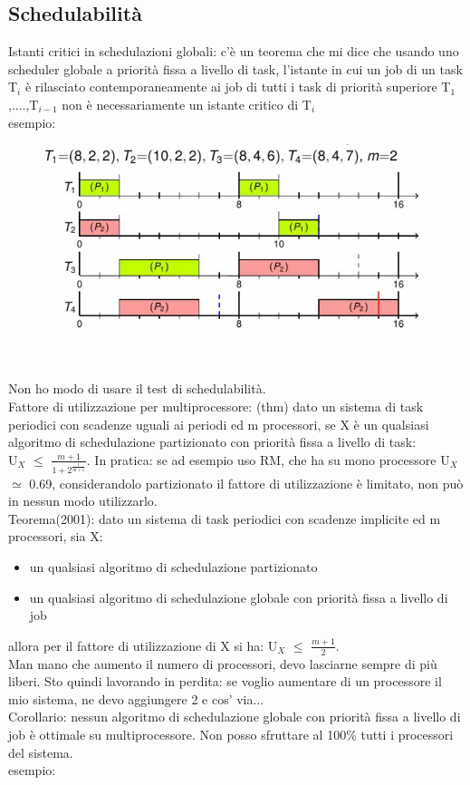 \documentclass[12pt, oneside]{extbook}
\begin{document}
\subsection{Schedulabilità}
Istanti critici in schedulazioni globali: c'è un teorema che mi dice che usando uno scheduler globale a priorità fissa a livello di task, l'istante in cui un job di un task T$_{i}$ è rilasciato contemporaneamente ai job di tutti i task di priorità superiore T$_{1}$,....,T$_{i-1}$ non è necessariamente un istante critico di T$_{i}$\\ esempio:\\
\begin{figure}[!h]
\centering
\includegraphics[scale=0.4]{immagini/image-041.jpg}
\end{figure}
\\Non ho modo di usare il test di schedulabilità.\\ Fattore di utilizzazione per multiprocessore: (thm) dato un sistema di task periodici con scadenze uguali ai periodi ed m processori, se X è un qualsiasi algoritmo di schedulazione partizionato con priorità fissa a livello di task:\\
U$_{X}$ $\leq$ $\frac{m + 1}{1 + 2^{\frac{1}{m +1}}}$. In pratica: se ad esempio uso RM, che ha su mono processore U$_{X}$ $\simeq$ 0.69, considerandolo partizionato il fattore di utilizzazione è limitato, non può in nessun modo utilizzarlo.\\ Teorema(2001): dato un sistema di task periodici con scadenze implicite ed m processori, sia X:
\begin{itemize}
\item un qualsiasi algoritmo di schedulazione partizionato
\item un qualsiasi algoritmo di schedulazione globale con priorità fissa a livello di job
\end{itemize}
allora per il fattore di utilizzazione di X si ha: U$_{X}$ $\leq$ $\frac{m + 1}{2}$.\\ Man mano che aumento il numero di processori, devo lasciarne sempre di più liberi. Sto quindi lavorando in perdita: se voglio aumentare di un processore il mio sistema, ne devo aggiungere 2 e cos' via...\\ Corollario: nessun algoritmo di schedulazione globale con priorità fissa a livello di job è ottimale su multiprocessore. Non posso sfruttare al 100\% tutti i processori del sistema.\\ esempio:\\
\end{document}
